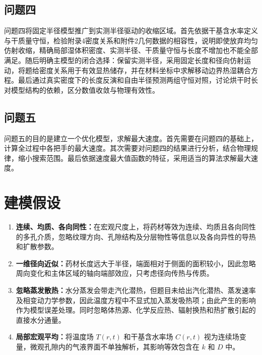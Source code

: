 \documentclass[withoutpreface,bwprint]{cumcmthesis}
\begin{document}
\subsection{问题四}
问题四将固定半径模型推广到实测半径驱动的收缩区域。首先依据干基含水率定义与干质量守恒，检验附录4密度关系和附件2几何数据的相容性，说明即使放弃均匀仿射收缩，精确局部湿体积密度、实测半径、干质量守恒与长度不增加也不能全部满足。随后明确主模型的闭合选择：保留实测半径，采用固定长度和径向仿射运动，将题给密度关系用于有效显热储存，并在材料坐标中求解移动边界热湿耦合方程。最后通过真实密度下的长度反演和自由半径预测两组守恒对照，讨论烘干时长对模型结构的依赖，区分数值收敛与物理有效性。

\subsection{问题五}
问题五的目的是建立一个优化模型，求解最大速度。首先需要在问题四的基础上，计算全过程中各把手的最大速度。其次需要对问题四的结果进行分析，结合物理规律，缩小搜索范围。最后依据速度最大值函数的特征，采用适当的算法求解最大速度。

\section{建模假设}
\begin{enumerate}[label=\arabic*.,leftmargin=2em,itemsep=0pt,topsep=0pt]
  \item \textbf{连续、均质、各向同性：}在宏观尺度上，将药材等效为连续、均质且各向同性的多孔介质，忽略纹理方向、孔隙结构及分层物性等信息以及各向异性的导热和扩散参数。
  \item \textbf{一维径向近似：}药材长度远大于半径，端面相对于侧面的面积较小，因此忽略周向变化和主体区域的轴向端部效应，只考虑径向传热与传质。
  \item \textbf{忽略蒸发散热：}水分蒸发会带走汽化潜热，但题目未给出汽化潜热、蒸发速率及相变动力学参数，因此温度方程中不显式加入蒸发吸热项；由此产生的影响作为模型误差处理。同时忽略体热源、化学反应热、辐射换热和热扩散引起的直接水分通量。
  \item \textbf{局部宏观平均：}将温度场 $T(r,t)$ 和干基含水率场 $C(r,t)$ 视为连续场变量，微观孔隙内的气液界面不单独解析，其影响等效包含在 $k$ 和 $D$ 中。

\end{enumerate}
\end{document}
